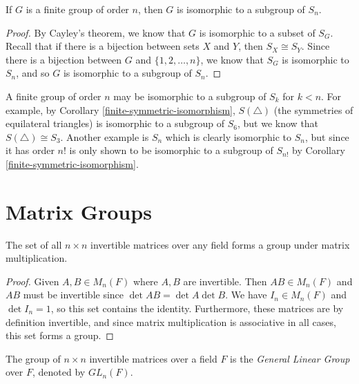 \begin{cor}\label{finite-symmetric-isomorphism}
    If $G$ is a finite group of order $n$, then $G$ is isomorphic to a subgroup of $S_n$.
\end{cor}

\begin{proof}
    By Cayley's theorem, we know that $G$ is isomorphic to a subset of $S_G$. Recall that if there is a bijection between sets $X$ and $Y$, then $S_X \cong S_Y$. Since there is a bijection between $G$ and $\{1, 2, \ldots, n\}$, we know that $S_G$ is isomorphic to $S_n$, and so $G$ is isomorphic to a subgroup of $S_n$.
\end{proof}

\begin{rmk}
    A finite group of order $n$ may be isomorphic to a subgroup of $S_k$ for $k < n$. For example, by Corollary \ref{finite-symmetric-isomorphism}, $S(\triangle)$ (the symmetries of equilateral triangles) is isomorphic to a subgroup of $S_6$, but we know that $S(\triangle) \cong S_3$. Another example is $S_n$ which is clearly isomorphic to $S_n$, but since it has order $n!$ is only shown to be isomorphic to a subgroup of $S_{n!}$ by Corollary \ref{finite-symmetric-isomorphism}.
\end{rmk}

\section{Matrix Groups}

\begin{prop}
    The set of all $n \times n$ invertible matrices over any field forms a group under matrix multiplication.
\end{prop}

\begin{proof}
    Given $A, B \in M_{n}(F)$ where $A,B$ are invertible. Then $AB \in M_{n}(F)$ and $AB$ must be invertible since $\det AB = \det A \det B$. We have $I_n \in M_{n}(F)$ and $\det I_n = 1$, so this set contains the identity. Furthermore, these matrices are by definition invertible, and since matrix multiplication is associative in all cases, this set forms a group.
\end{proof}

\begin{defn}
    The group of $n \times n$ invertible matrices over a field $F$ is the \emph{General Linear Group} over $F$, denoted by $GL_n(F)$.
\end{defn}

